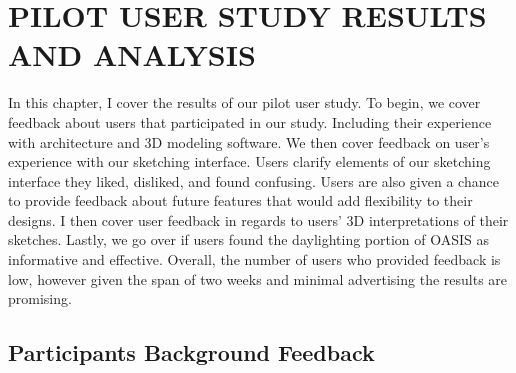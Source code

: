 \chapter{PILOT USER STUDY RESULTS AND ANALYSIS} \label{sec:results}

In this chapter,  I cover the results of our pilot user study.  To begin, we cover feedback  about users that participated in our study.  Including their experience with architecture and 3D modeling software.  We then cover feedback on user's experience with our sketching interface.  Users clarify elements of  our sketching interface they liked, disliked, and found confusing.  Users are also given a chance to provide feedback about future features that would add flexibility to their designs.  I then cover user feedback in regards to users' 3D interpretations of their sketches.  Lastly, we go over if users found the daylighting portion of OASIS as informative and effective.  Overall, the number of users who provided feedback is low, however given the span of two weeks and minimal advertising the results are promising.  \\ 


\section{Participants Background Feedback}

